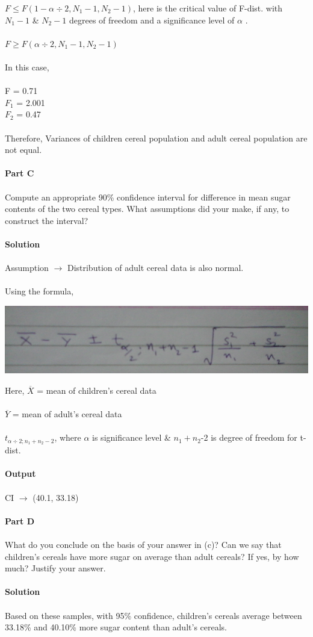 \documentclass[12pt,a4paper]{report}
\begin{document}
$F \leq F(1-\alpha \div 2,N_1-1,N_2-1)$, here is the critical value of F-dist. with $N_1-1$ \& $N_2 - 1 $ degrees of freedom and a significance level of $\alpha$ .\\\\
$F \geq F(\alpha \div 2,N_1-1,N_2-1)$\\
\\
In this case,\\\\
F = 0.71\\
$F_1$ = 2.001\\
$F_2$ = 0.47\\\\
Therefore, Variances of children cereal population and adult cereal population are not equal.
\\\\
\textbf{Part C}\\\\
Compute an appropriate 90\% confidence interval for difference in mean sugar contents of the two cereal types. What assumptions did your make, if any, to construct the interval?
\\\\
\textbf{Solution}
\\\\
Assumption $\rightarrow$ Distribution of adult cereal data is also normal.
\\\\
Using the formula,
\begin{center}
\includegraphics[scale=0.5]{mean.png}
\end{center}
Here,
$\overline{X}$ = mean of children's cereal data\\\\
$\overline{Y}$ = mean of adult's cereal data\\\\
$t_{\alpha \div 2; n_1+n_2-2}$, where $\alpha$ is significance level \& $n_1+n_2$-2 is degree of freedom for t-dist.\\\\
\textbf{Output}\\\\
CI $\rightarrow$ (40.1, 33.18)
\\\\
\textbf{Part D}\\\\
What do you conclude on the basis of your answer in (c)? Can we say that children’s cereals have more sugar on average than adult cereals? If yes, by how much? Justify your answer.
\\\\
\textbf{Solution}\\\\
Based on these samples, with 95\% confidence, children's cereals average between 33.18\% and 40.10\%
more sugar content than adult's cereals.
\\
\newpage
\end{document}
